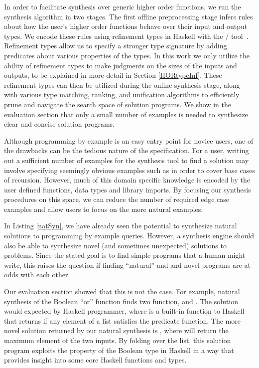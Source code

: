 In order to facilitate synthesis over generic higher order functions, we run the synthesis algorithm in two stages.
The first offline preprocessing stage infers rules about how the user's higher order functions behave over their input and output types.
We encode these rules using refinement types in Haskell with the \lhask/ tool~\cite{DBLP:conf/haskell/VazouSJ14}.
Refinement types allow us to specify a stronger type signature by adding predicates about various properties of the types.
In this work we only utilize the ability of refinement types to make judgments on the sizes of the inputs and outputs, to be explained in more detail in Section \ref{HORtypeInf}.
These refinement types can then be utilized during the online synthesis stage, along with various type matching, ranking, and unification algorithms to efficiently prune and navigate the search space of solution programs.
We show in the evaluation section that only a small number of examples is needed to synthesize clear and concise solution programs.

Although programming by example is an easy entry point for novice users, one of the drawbacks can be the tedious nature of the specification.
For a user, writing out a sufficient number of examples for the synthesis tool to find a solution may involve
  specifying seemingly obvious examples such as \codeinline{[]->[]} in order to cover base cases of recursion.
However, much of this domain specific knowledge is encoded by the user defined functions, data types and library imports. By focusing our synthesis procedures on this space, we can reduce the number of required edge case examples and allow users to focus on the more natural examples.

In Listing \ref{natSyn}, we have already seen the potential to synthesize natural solutions to programming by example queries.
However, a synthesis engine should also be able to synthesize novel (and sometimes unexpected) solutions to problems.
Since the stated goal is to find simple programs that a human might write, this raises the question if finding ``natural'' and and novel programs are at odds with each other.

Our evaluation section showed that this is not the case.
For example, natural synthesis of the Boolean ``or'' function finds two function,  and .
The  solution would expected by Haskell programmer, where  is a built-in function to Haskell that returns  if any element of a list satisfies the predicate function.
The more novel solution returned by our natural synthesis is , where  will return the maximum element of the two inputs.
By folding over the list, this solution program exploits the  property of the Boolean type in Haskell in a way that provides insight into some core Haskell functions and types.

